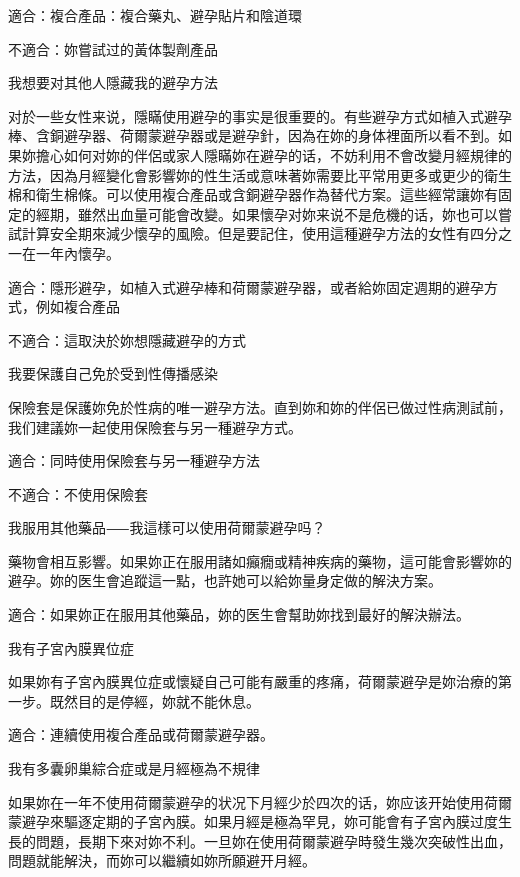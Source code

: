 \documentclass[12pt,UTF8]{ctexbook}
\begin{document}
適合：複合產品：複合藥丸、避孕貼片和陰道環

不適合：妳嘗試过的黃体製劑產品





我想要对其他人隱藏我的避孕方法


对於一些女性来说，隱瞞使用避孕的事实是很重要的。有些避孕方式如植入式避孕棒、含銅避孕器、荷爾蒙避孕器或是避孕針，因為在妳的身体裡面所以看不到。如果妳擔心如何对妳的伴侶或家人隱瞞妳在避孕的话，不妨利用不會改變月經規律的方法，因為月經變化會影響妳的性生活或意味著妳需要比平常用更多或更少的衛生棉和衛生棉條。可以使用複合產品或含銅避孕器作為替代方案。這些經常讓妳有固定的經期，雖然出血量可能會改變。如果懷孕对妳来说不是危機的话，妳也可以嘗試計算安全期來減少懷孕的風險。但是要記住，使用這種避孕方法的女性有四分之一在一年內懷孕。

適合：隱形避孕，如植入式避孕棒和荷爾蒙避孕器，或者給妳固定週期的避孕方式，例如複合產品

不適合：這取決於妳想隱藏避孕的方式





我要保護自己免於受到性傳播感染


保險套是保護妳免於性病的唯一避孕方法。直到妳和妳的伴侶已做过性病測試前，我们建議妳一起使用保險套与另一種避孕方式。

適合：同時使用保險套与另一種避孕方法

不適合：不使用保險套





我服用其他藥品⸺我這樣可以使用荷爾蒙避孕吗？


藥物會相互影響。如果妳正在服用諸如癲癇或精神疾病的藥物，這可能會影響妳的避孕。妳的医生會追蹤這一點，也許她可以給妳量身定做的解決方案。

適合：如果妳正在服用其他藥品，妳的医生會幫助妳找到最好的解決辦法。





我有子宮內膜異位症


如果妳有子宮內膜異位症或懷疑自己可能有嚴重的疼痛，荷爾蒙避孕是妳治療的第一步。既然目的是停經，妳就不能休息。

適合：連續使用複合產品或荷爾蒙避孕器。





我有多囊卵巢綜合症或是月經極為不規律


如果妳在一年不使用荷爾蒙避孕的状况下月經少於四次的话，妳应该开始使用荷爾蒙避孕來驅逐定期的子宮內膜。如果月經是極為罕見，妳可能會有子宮內膜过度生長的問題，長期下來对妳不利。一旦妳在使用荷爾蒙避孕時發生幾次突破性出血，問題就能解決，而妳可以繼續如妳所願避开月經。
\end{document}
